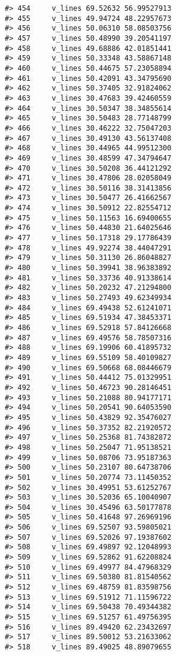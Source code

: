 \documentclass[
]{book}
\theoremstyle{definition}
\theoremstyle{definition}
\theoremstyle{definition}
\theoremstyle{definition}
\theoremstyle{remark}
\begin{document}
\begin{verbatim}
#> 454     v_lines 69.52632 56.99527913
#> 455     v_lines 49.94724 48.22957673
#> 456     v_lines 50.06310 58.08503756
#> 457     v_lines 50.48990 39.20541197
#> 458     v_lines 49.68886 42.01851441
#> 459     v_lines 50.33348 43.58867148
#> 460     v_lines 50.44675 57.23058894
#> 461     v_lines 50.42091 43.34795690
#> 462     v_lines 50.37405 32.91824062
#> 463     v_lines 30.47683 39.42460559
#> 464     v_lines 30.50347 38.34855614
#> 465     v_lines 30.50483 28.77148799
#> 466     v_lines 30.46222 32.75047203
#> 467     v_lines 30.49130 43.56137408
#> 468     v_lines 30.44965 44.99512300
#> 469     v_lines 30.48599 47.34794647
#> 470     v_lines 30.50208 36.44121292
#> 471     v_lines 30.47806 28.02058049
#> 472     v_lines 30.50116 38.31413856
#> 473     v_lines 30.50477 26.41662567
#> 474     v_lines 30.50912 22.82554712
#> 475     v_lines 50.11563 16.69400655
#> 476     v_lines 50.44830 21.64025646
#> 477     v_lines 50.17318 29.17786439
#> 478     v_lines 49.92274 38.44047291
#> 479     v_lines 50.31130 26.86048827
#> 480     v_lines 50.39941 38.96383892
#> 481     v_lines 50.33736 40.91338614
#> 482     v_lines 50.20232 47.21294800
#> 483     v_lines 50.27493 49.62349934
#> 484     v_lines 69.49438 52.61241071
#> 485     v_lines 69.51934 47.38453371
#> 486     v_lines 69.52918 57.84126668
#> 487     v_lines 69.49576 58.78507316
#> 488     v_lines 69.19906 60.41895732
#> 489     v_lines 69.55109 58.40109827
#> 490     v_lines 69.50668 68.08446679
#> 491     v_lines 50.44412 75.01329951
#> 492     v_lines 50.46723 90.28146451
#> 493     v_lines 50.21088 80.94177171
#> 494     v_lines 50.20541 90.64053590
#> 495     v_lines 50.43829 92.35476027
#> 496     v_lines 50.37352 82.21920572
#> 497     v_lines 50.25368 81.74382872
#> 498     v_lines 50.25047 71.95138521
#> 499     v_lines 50.08706 73.95187363
#> 500     v_lines 50.23107 80.64738706
#> 501     v_lines 50.20774 73.11450352
#> 502     v_lines 30.49951 53.61252767
#> 503     v_lines 30.52036 65.10040907
#> 504     v_lines 30.45496 63.50177878
#> 505     v_lines 50.41648 97.26969196
#> 506     v_lines 69.52507 93.59805021
#> 507     v_lines 69.52026 97.19387602
#> 508     v_lines 69.49897 92.12048993
#> 509     v_lines 69.52862 91.62208824
#> 510     v_lines 69.49977 84.47968329
#> 511     v_lines 69.50380 81.81540562
#> 512     v_lines 69.48759 81.83598756
#> 513     v_lines 69.51912 71.11596722
#> 514     v_lines 69.50438 70.49344382
#> 515     v_lines 69.51257 61.49756395
#> 516     v_lines 89.49420 62.23432697
#> 517     v_lines 89.50012 53.21633062
#> 518     v_lines 89.49025 48.89079655

\end{verbatim}
\end{document}
